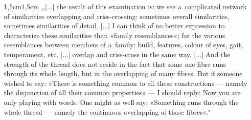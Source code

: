 \documentclass[11pt,a4paper,twoside]{report}
\begin{document}
\begin{adjustwidth}{1,5cm}{1,5cm}
\small{
,,[...] the result of this examination is: we see a~complicated network of similarities overlapping and criss-crossing: sometimes overall similarities, sometimes similarities of detail. [...] I can think of no better expression to characterize these similarities than »family resemblances«; for the various resemblances between members of a~family: build, features, colour of eyes, gait, temperament, etc. [...] overlap and criss-cross in the same way. [...] And the strength of the thread does not reside in the fact that some one fibre runs through its whole length, but in the overlapping of many fibres. But if someone wished to say: »There is something common to all these constructions --- namely the disjunction of all their common properties« --- I should reply: Now you are only playing with words. One might as well say: »Something runs through the whole thread --- namely the continuous overlapping of those fibres«.''\\
}
\end{adjustwidth}


\newpage
\end{document}
